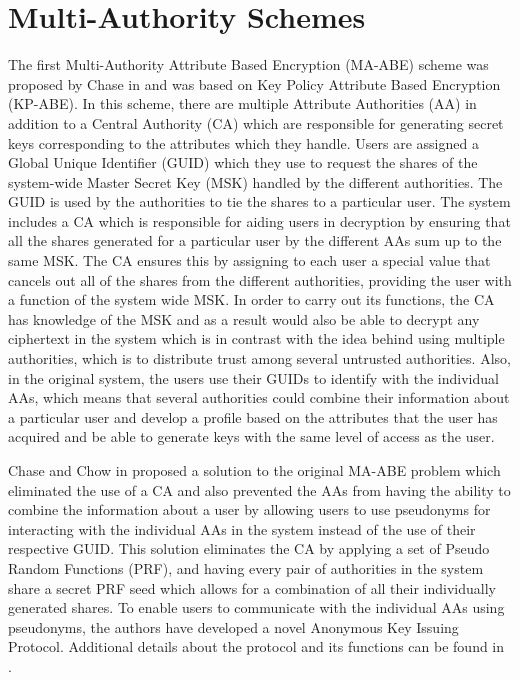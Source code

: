 \section{Multi-Authority Schemes}\label{multi}

The first Multi-Authority Attribute Based Encryption (MA-ABE) scheme was proposed by Chase in \cite{Chase2007, Chow2010} and was based on Key Policy Attribute Based Encryption (KP-ABE). In this scheme, there are multiple Attribute Authorities (AA) in addition to a Central Authority (CA) which are responsible for generating secret keys corresponding to the attributes which they handle. Users are assigned a Global Unique Identifier (GUID) which they use to request the shares of the system-wide Master Secret Key (MSK) handled by the different authorities. The GUID is used by the authorities to tie the shares to a particular user. The system includes a CA which is responsible for aiding users in decryption by ensuring that all the shares generated for a particular user by the different AAs sum up to the same MSK. The CA ensures this by assigning to each user a special value that cancels out all of the shares from the different authorities, providing the user with a function of the system wide MSK. In order to carry out its functions, the CA has knowledge of the MSK and as a result would also be able to decrypt any ciphertext in the system which is in contrast with the idea behind using multiple authorities, which is to distribute trust among several untrusted authorities. Also, in the original system, the users use their GUIDs to identify with the individual AAs, which means that several authorities could combine their information about a particular user and develop a profile based on the attributes that the user has acquired and be able to generate keys with the same level of access as the user.

Chase and Chow in \cite{Chase2009} proposed a solution to the original MA-ABE problem which eliminated the use of a CA and also prevented the AAs from having the ability to combine the information about a user by allowing users to use pseudonyms for interacting with the individual AAs in the system instead of the use of their respective GUID. This solution eliminates the CA by applying a set of Pseudo Random Functions (PRF), and having every pair of authorities in the system share a secret PRF seed which allows for a combination of all their individually generated shares. To enable users to communicate with the individual AAs using pseudonyms, the authors have developed a novel Anonymous Key Issuing Protocol. Additional details about the protocol and its functions can be found in \cite{Chow2010, Chase2009}.

